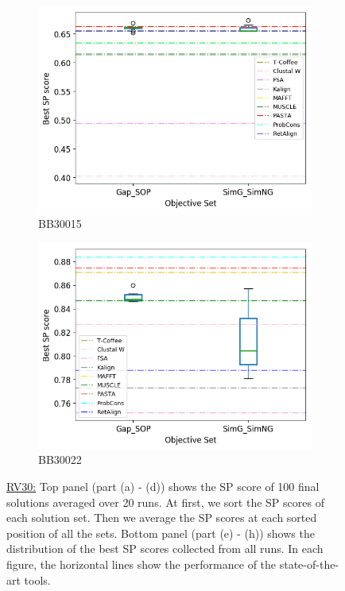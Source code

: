 \begin{figure}[!htbp]
\begin{adjustwidth}{-1cm}{-1cm}
\begin{subfigure}{0.22\textwidth}
			\includegraphics[width=\columnwidth]{Figure/summary/precomputedInit/Balibase/BB30015_objset_pairs_rank_2}
			\caption{BB30015}
		\end{subfigure}
		\begin{subfigure}{0.22\textwidth}
			\includegraphics[width=\columnwidth]{Figure/summary/precomputedInit/Balibase/BB30022_objset_pairs_rank_2}
			\caption{BB30022}
		\end{subfigure}
		\caption{\underline{RV30:} Top panel (part (a) - (d)) shows the SP score of 100 final solutions averaged over 20 runs. At first, we sort the SP scores of each solution set. Then we average the SP scores at each sorted position of all the sets. Bottom panel (part (e) - (h)) shows the distribution of the best SP scores collected from all runs. In each figure, the horizontal lines show the performance of the state-of-the-art tools.}
		\label{fig:rv30_sp}
	\end{adjustwidth}
\end{figure}


